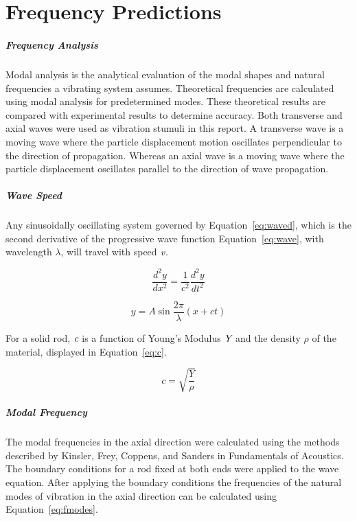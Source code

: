 \chapter{Frequency Predictions}
\paragraph{Frequency Analysis}
Modal analysis is the analytical evaluation of the modal shapes and natural frequencies a vibrating system assumes. Theoretical frequencies are calculated using modal analysis for predetermined modes. These theoretical results are compared with experimental results to determine accuracy. Both transverse and axial waves were used as vibration stumuli in this report. A transverse wave is a moving wave where the particle displacement motion oscillates perpendicular to the direction of propagation. Whereas an axial wave is a moving wave where the particle displacement oscillates parallel to the direction of wave propagation.
\paragraph{Wave Speed} 
Any sinusoidally oscillating system governed by Equation~\ref{eq:waved}, which is the second derivative of the progressive wave function Equation~\ref{eq:wave}, with wavelength $\lambda$, will travel with speed $\emph{v}$.  

\begin{equation} \label{eq:waved}
\frac{d^2y}{dx^2} = \frac{1}{c^2} \frac{d^2y}{dt^2}
\end{equation}

\begin{equation} \label{eq:wave}
y = A\sin{\frac{2\pi}{\lambda}(x+ct)}
\end{equation}

For a solid rod, $\emph{c}$ is a function of Young's Modulus $\emph{Y}$ and the density $\rho$ of the material, displayed in Equation~\ref{eq:c}. 

\begin{equation} \label{eq:c}
c=\sqrt{\frac{Y}{\rho}}
\end{equation}

\paragraph{Modal Frequency}
The modal frequencies in the axial direction were calculated using the methods described by Kinsler, Frey, Coppens, and Sanders in Fundamentals of Acoustics. The boundary conditions for a rod fixed at both ends were applied to the wave equation. After applying the boundary conditions the frequencies of the natural modes of vibration in the axial direction can be calculated using Equation~\ref{eq:fmodes}.

